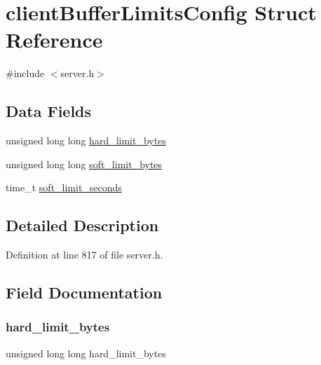 \hypertarget{structclient_buffer_limits_config}{}\section{client\+Buffer\+Limits\+Config Struct Reference}
\label{structclient_buffer_limits_config}


{\ttfamily \#include $<$server.\+h$>$}

\subsection*{Data Fields}
\begin{DoxyCompactItemize}
\item 
unsigned long long \hyperlink{structclient_buffer_limits_config_a1075b18921e5831210b7ac7c50536e72}{hard\+\_\+limit\+\_\+bytes}
\item 
unsigned long long \hyperlink{structclient_buffer_limits_config_a27e849894bc8a3ceb8f7935266241bdc}{soft\+\_\+limit\+\_\+bytes}
\item 
time\+\_\+t \hyperlink{structclient_buffer_limits_config_a78c15393dd06a546fbaa7ddf91d3c299}{soft\+\_\+limit\+\_\+seconds}
\end{DoxyCompactItemize}


\subsection{Detailed Description}


Definition at line 817 of file server.\+h.



\subsection{Field Documentation}
\mbox{\label{structclient_buffer_limits_config_a1075b18921e5831210b7ac7c50536e72}} 
\subsubsection{\texorpdfstring{hard\+\_\+limit\+\_\+bytes}{hard\_limit\_bytes}}
{\footnotesize\ttfamily unsigned long long hard\+\_\+limit\+\_\+bytes}



